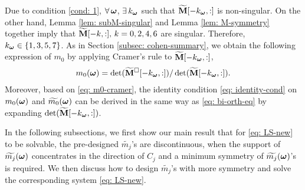 Due to condition \ref{cond: 1}, $\forall\,\boldsymbol{\omega}$, $\exists\, k_{\boldsymbol{\omega}}$ such that $\widetilde{\mathbf{M}}[-k_{\boldsymbol{\omega}},:]$ is non-singular. On the other hand, Lemma \ref{lem: subM-singular} and Lemma \ref{lem: M-symmetry} together imply that $\widetilde{\mathbf{M}}[-k,:],\,k=0,2,4,6$ are singular. Therefore, $k_{\boldsymbol{\omega}} \in\{1,3,5,7\}$. 
As in Section \ref{subsec: cohen-summary}, we obtain the following expression of $m_0$ by applying Cramer's rule to $\widetilde{\mathbf{M}}[-k_{\boldsymbol{\omega}},:]$, 
\begin{align}\label{eq: m0-cramer}
m_0(\boldsymbol{\omega}) = \det(\widetilde{\mathbf{M}}^{\Box}[-k_{\boldsymbol{\omega}},:])/\det(\widetilde{\mathbf{M}}[-k_{\boldsymbol{\omega}},:]).
\end{align}
Moreover, based on \eqref{eq: m0-cramer}, the identity condition \eqref{eq: identity-cond} on $m_0(\boldsymbol{\omega})$ and $\widetilde{m_{0}}(\boldsymbol{\omega})$ can be derived in the same way as \eqref{eq: bi-orth-eq} by expanding $\det(\widetilde{\mathbf{M}}[-k_{\boldsymbol{\omega}},:])$.

In the following subsections, we first show our main result that for \eqref{eq: LS-new} to be solvable, the pre-designed $\widetilde{m_j}$'s are discontinuous, when the support of $\widetilde{m_{j}}(\boldsymbol{\omega})$ concentrates in the direction of $C_j$ and a minimum symmetry of $\widetilde{m_{j}}(\boldsymbol{\omega})$'s is required. We then discuss how to design $\widetilde{m_j}$'s with more symmetry and solve the corresponding system \eqref{eq: LS-new}.

